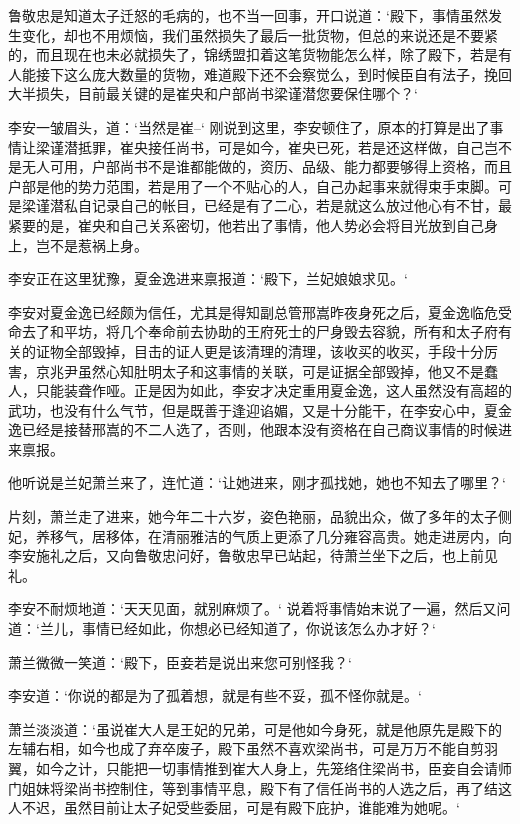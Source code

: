 鲁敬忠是知道太子迁怒的毛病的，也不当一回事，开口说道：‘殿下，事情虽然发生变化，却也不用烦恼，我们虽然损失了最后一批货物，但总的来说还是不要紧的，而且现在也未必就损失了，锦绣盟扣着这笔货物能怎么样，除了殿下，若是有人能接下这么庞大数量的货物，难道殿下还不会察觉么，到时候臣自有法子，挽回大半损失，目前最关键的是崔央和户部尚书梁谨潜您要保住哪个？‘

李安一皱眉头，道：‘当然是崔--‘ 刚说到这里，李安顿住了，原本的打算是出了事情让梁谨潜抵罪，崔央接任尚书，可是如今，崔央已死，若是还这样做，自己岂不是无人可用，户部尚书不是谁都能做的，资历、品级、能力都要够得上资格，而且户部是他的势力范围，若是用了一个不贴心的人，自己办起事来就得束手束脚。可是梁谨潜私自记录自己的帐目，已经是有了二心，若是就这么放过他心有不甘，最紧要的是，崔央和自己关系密切，他若出了事情，他人势必会将目光放到自己身上，岂不是惹祸上身。

李安正在这里犹豫，夏金逸进来禀报道：‘殿下，兰妃娘娘求见。‘

李安对夏金逸已经颇为信任，尤其是得知副总管邢嵩昨夜身死之后，夏金逸临危受命去了和平坊，将几个奉命前去协助的王府死士的尸身毁去容貌，所有和太子府有关的证物全部毁掉，目击的证人更是该清理的清理，该收买的收买，手段十分厉害，京兆尹虽然心知肚明太子和这事情的关联，可是证据全部毁掉，他又不是蠢人，只能装聋作哑。正是因为如此，李安才决定重用夏金逸，这人虽然没有高超的武功，也没有什么气节，但是既善于逢迎谄媚，又是十分能干，在李安心中，夏金逸已经是接替邢嵩的不二人选了，否则，他跟本没有资格在自己商议事情的时候进来禀报。

他听说是兰妃萧兰来了，连忙道：‘让她进来，刚才孤找她，她也不知去了哪里？‘

片刻，萧兰走了进来，她今年二十六岁，姿色艳丽，品貌出众，做了多年的太子侧妃，养移气，居移体，在清丽雅洁的气质上更添了几分雍容高贵。她走进房内，向李安施礼之后，又向鲁敬忠问好，鲁敬忠早已站起，待萧兰坐下之后，也上前见礼。

李安不耐烦地道：‘天天见面，就别麻烦了。‘ 说着将事情始末说了一遍，然后又问道：‘兰儿，事情已经如此，你想必已经知道了，你说该怎么办才好？‘

萧兰微微一笑道：‘殿下，臣妾若是说出来您可别怪我？‘

李安道：‘你说的都是为了孤着想，就是有些不妥，孤不怪你就是。‘

萧兰淡淡道：‘虽说崔大人是王妃的兄弟，可是他如今身死，就是他原先是殿下的左辅右相，如今也成了弃卒废子，殿下虽然不喜欢梁尚书，可是万万不能自剪羽翼，如今之计，只能把一切事情推到崔大人身上，先笼络住梁尚书，臣妾自会请师门姐妹将梁尚书控制住，等到事情平息，殿下有了信任尚书的人选之后，再了结这人不迟，虽然目前让太子妃受些委屈，可是有殿下庇护，谁能难为她呢。‘

